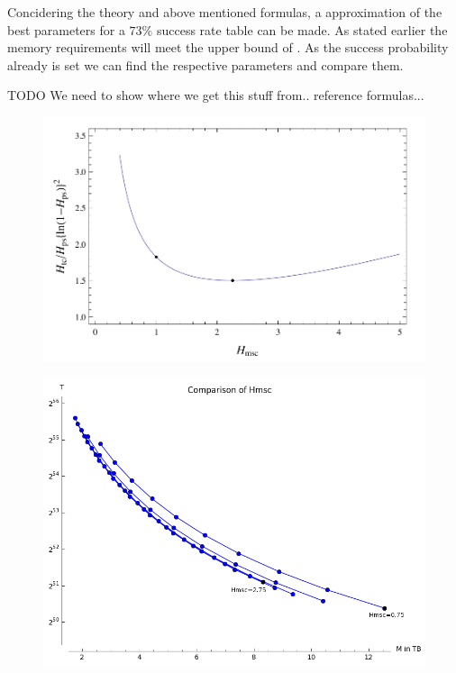 Concidering the theory and above mentioned formulas, a approximation of the best parameters for a $73\%$ success rate table can be made.
As stated earlier the memory requirements will meet the upper bound of
. 
As the success probability already is set we can find the respective parameters and compare them.

TODO We need to show where we get this stuff from.. reference
formulas...
\begin{figure}[H]
  \centering
  \begin{minipage}{0.45\textwidth}
    \centering
    \includegraphics[width=1.2\textwidth]{figures/HellmanTradeOff.png}
    \label{fig:hellTC}
  \end{minipage}\hfill
  \begin{minipage}{0.45\textwidth}
    \centering
    \includegraphics[width=1.2\textwidth]{figures/compareHmsc.png}
    \label{fig:hellHmsc}
  \end{minipage}
\end{figure}
